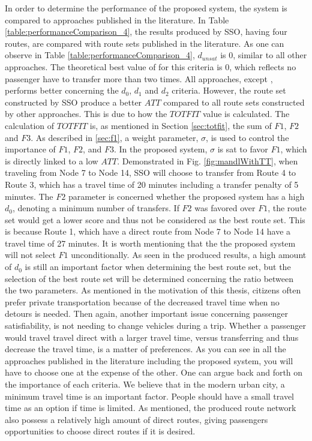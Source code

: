 In order to determine the performance of the proposed system, the system is compared to approaches published in the literature. In Table \vref{table:performanceComparison_4}, the results produced by SSO, having four routes, are compared with route sets published in the literature. As one can observe in Table \vref{table:performanceComparison_4},  $d_{unsat}$ is 0, similar to all other approaches. The theoretical best value of for this criteria is 0, which reflects no passenger have to transfer more than two times. All approaches, except \citep{mandl79, kidwai98, chakroborty02}, performs better concerning the $d_0$, $d_1$ and $d_2$ criteria. However, the route set constructed by SSO produce a better $ATT$ compared to all route sets constructed by  other approaches. This is due to how the $TOTFIT$ value is calculated. The calculation of $TOTFIT$ is, as mentioned in Section \vref{sec:totfit}, the sum of $F1$, $F2$ and $F3$. As described in \vref{sec:f1}, a weight parameter, $\sigma$, is used to control the importance of $F1$, $F2$, and $F3$. In the proposed system, $\sigma$ is sat to favor $F1$, which is directly linked to a low $ATT$. Demonstrated in Fig. \vref{fig:mandlWithTT}, when traveling from Node 7 to Node 14, SSO will choose to transfer from Route 4 to Route 3, which has a travel time of 20 minutes including a transfer penalty of 5 minutes. The $F2$ parameter is concerned whether the proposed system has a high $d_0$, denoting a minimum number of transfers. If $F2$ was favored over $F1$, the route set would get a lower score and thus not be considered as the best route set. This is because Route 1, which have a direct route from Node 7 to Node 14 have a travel time of 27 minutes. It is worth mentioning that the the proposed system will not select $F1$ unconditionally. As seen in the produced results, a high amount of $d_0$ is still an important factor when determining the best route set, but the selection of the best route set will be determined concerning the ratio between the two parameters. As mentioned in the motivation of this thesis, citizens often prefer private transportation because of the decreased travel time when no detours is needed. Then again, another important issue concerning passenger satisfiability, is not needing to change vehicles during a trip. Whether a passenger would travel travel direct with a larger travel time, versus transferring and thus decrease the travel time, is a matter of preferences. As you can see in all the approaches published in the literature including the proposed system, you will have to choose one at the expense of the other. One can argue back and forth on the importance of each criteria. We believe that in the modern urban city, a minimum travel time is an important factor. People should have a small travel time as an option if time is limited. As mentioned, the produced route network also possess a relatively high amount of direct routes, giving passengers opportunities to choose direct routes if it is desired. 

